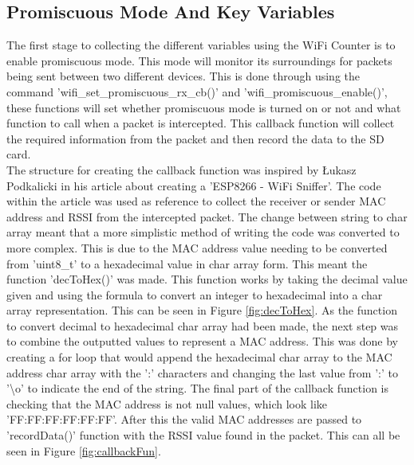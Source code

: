 \documentclass{report}
\begin{document}
\subsection{Promiscuous Mode And Key Variables}
The first stage to collecting the different variables using the WiFi Counter is to enable promiscuous mode. This mode will monitor its surroundings for packets being sent between two different devices. This is done through using the command 'wifi\_set\_promiscuous\_rx\_cb()'\cite{activate_promiscous_mode} and 'wifi\_promiscuous\_enable()'\cite{activate_promiscous_mode}, these functions will set whether promiscuous mode is turned on or not and what function to call when a packet is intercepted. This callback function will collect the required information from the packet and then record the data to the SD card. \\ \newline
The structure for creating the callback function was inspired by  Łukasz Podkalicki in his article about creating a 'ESP8266 - WiFi Sniffer'\cite{promiscuous_mode}. The code within the article was used as reference to collect the receiver or sender MAC address and RSSI from the intercepted packet. The change between string to char array meant that a more simplistic method of writing the code was converted to more complex. This is due to the MAC address value needing to be converted from 'uint8\_t' to a hexadecimal value in char array form. This meant the function 'decToHex()' was made. This function works by taking the decimal value given and using the formula to convert an integer to hexadecimal into a char array representation. This can be seen in Figure \ref{fig:decToHex}. As the function to convert decimal to hexadecimal char array had been made, the next step was to combine the outputted values to represent a MAC address. This was done by creating a for loop that would append the hexadecimal char array to the MAC address char array with the ':' characters and changing the last value from ':' to '\textbackslash o' to indicate the end of the string. The final part of the callback function is checking that the MAC address is not null values, which look like 'FF:FF:FF:FF:FF:FF'. After this the valid MAC addresses are passed to 'recordData()' function with the RSSI value found in the packet. This can all be seen in Figure \ref{fig:callbackFun}.\\ \newline
\end{document}
